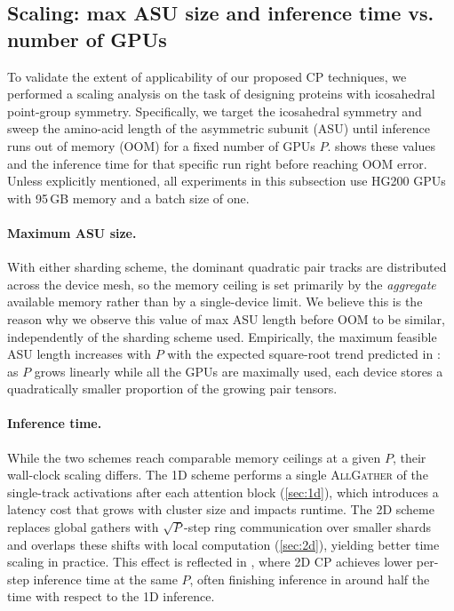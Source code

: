 \documentclass{article}
\theoremstyle{plain}
\theoremstyle{definition}
\theoremstyle{remark}
\begin{document}
\subsection{Scaling: max ASU size and inference time vs. number of GPUs}
\label{sec:results-scaling}

To validate the extent of applicability of our proposed CP techniques, we performed a scaling analysis on the task of designing proteins with icosahedral point-group symmetry. Specifically, we target the icosahedral symmetry and sweep the amino-acid length of the asymmetric subunit (ASU) until inference runs out of memory (OOM) for a fixed number of GPUs $P$.  shows these values and the inference time for that specific run right before reaching OOM error. Unless explicitly mentioned, all experiments in this subsection use HG200 GPUs with 95\,GB memory and a batch size of one.

\paragraph{Maximum ASU size.}
With either sharding scheme, the dominant quadratic pair tracks are distributed across the device mesh, so the memory ceiling is set primarily by the \emph{aggregate} available memory rather than by a single-device limit.  We believe this is the reason why we observe this value of max ASU length before OOM to be similar, independently of the sharding scheme used.  Empirically, the maximum feasible ASU length increases with $P$ with the expected square-root trend predicted in : as $P$ grows linearly while all the GPUs are maximally used, each device stores a quadratically smaller proportion of the growing pair tensors. 

\paragraph{Inference time.}
While the two schemes reach comparable memory ceilings at a given $P$, their wall-clock scaling differs. The 1D scheme performs a single \textsc{AllGather} of the single-track activations after each attention block (\cref{sec:1d}), which introduces a latency cost that grows with cluster size and impacts runtime. The 2D scheme replaces global gathers with $\sqrt{P}$-step ring communication over smaller shards and overlaps these shifts with local computation (\cref{sec:2d}), yielding better time scaling in practice. This effect is reflected in , where 2D CP achieves lower per-step inference time at the same $P$, often finishing inference in around half the time with respect to the 1D inference.
\end{document}
